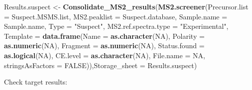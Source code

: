 \documentclass[]{article}
\newenvironment{Shaded}{\begin{snugshade}}{\end{snugshade}}
\newcommand{\KeywordTok}[1]{\textcolor[rgb]{0.13,0.29,0.53}{\textbf{#1}}}
\newcommand{\DataTypeTok}[1]{\textcolor[rgb]{0.13,0.29,0.53}{#1}}
\newcommand{\StringTok}[1]{\textcolor[rgb]{0.31,0.60,0.02}{#1}}
\newcommand{\OtherTok}[1]{\textcolor[rgb]{0.56,0.35,0.01}{#1}}
\newcommand{\OperatorTok}[1]{\textcolor[rgb]{0.81,0.36,0.00}{\textbf{#1}}}
\newcommand{\NormalTok}[1]{#1}
\begin{document}
\begin{Shaded}
\begin{Highlighting}[]
\NormalTok{Results.suspect <-}\StringTok{ }\KeywordTok{Consolidate_MS2_results}\NormalTok{(}\KeywordTok{MS2.screener}\NormalTok{(}\DataTypeTok{Precursor.list =}\NormalTok{  Suspect.MSMS.list,}
                                                       \DataTypeTok{MS2.peaklist =}\NormalTok{ Suspect.database,}
                                                       \DataTypeTok{Sample.name =}\NormalTok{ Sample.name,}
                                                       \DataTypeTok{Type =} \StringTok{"Suspect"}\NormalTok{,}
                                                       \DataTypeTok{MS2.ref.spectra.type =} \StringTok{"Experimental"}\NormalTok{,}
                                                       \DataTypeTok{Template =} \KeywordTok{data.frame}\NormalTok{(}\DataTypeTok{Name =} \KeywordTok{as.character}\NormalTok{(}\OtherTok{NA}\NormalTok{),}
                                                                             \DataTypeTok{Polarity =} \KeywordTok{as.numeric}\NormalTok{(}\OtherTok{NA}\NormalTok{),}
                                                                             \DataTypeTok{Fragment =} \KeywordTok{as.numeric}\NormalTok{(}\OtherTok{NA}\NormalTok{),}
                                                                             \DataTypeTok{Status.found =} \KeywordTok{as.logical}\NormalTok{(}\OtherTok{NA}\NormalTok{),}
                                                                             \DataTypeTok{CE.level =} \KeywordTok{as.character}\NormalTok{(}\OtherTok{NA}\NormalTok{),                         }
                                                                             \DataTypeTok{File.name =} \OtherTok{NA}\NormalTok{, }\DataTypeTok{stringsAsFactors =} \OtherTok{FALSE}\NormalTok{)),}\DataTypeTok{Storage_sheet =}\NormalTok{ Results.suspect)}
\end{Highlighting}
\end{Shaded}

Check target results:

\begin{Shaded}
\end{Shaded}
\end{document}
